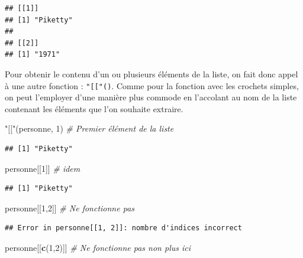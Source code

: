 \documentclass[
  11pt,
]{book}
\newenvironment{Shaded}{\begin{snugshade}}{\end{snugshade}}
\newcommand{\CommentTok}[1]{\textcolor[rgb]{0.56,0.35,0.01}{\textit{#1}}}
\newcommand{\DecValTok}[1]{\textcolor[rgb]{0.00,0.00,0.81}{#1}}
\newcommand{\KeywordTok}[1]{\textcolor[rgb]{0.13,0.29,0.53}{\textbf{#1}}}
\newcommand{\NormalTok}[1]{#1}
\newcommand{\StringTok}[1]{\textcolor[rgb]{0.31,0.60,0.02}{#1}}
\numberwithin{equation}{section}
\numberwithin{countremarque}{section}
\begin{document}
\begin{lstlisting}
## [[1]]
## [1] "Piketty"
## 
## [[2]]
## [1] "1971"
\end{lstlisting}

Pour obtenir le contenu d'un ou plusieurs éléments de la liste, on fait donc appel à une autre fonction : \texttt{"{[}{[}"()}. Comme pour la fonction avec les crochets simples, on peut l'employer d'une manière plus commode en l'accolant au nom de la liste contenant les éléments que l'on souhaite extraire.

\begin{Shaded}
\begin{Highlighting}[]
\StringTok{"[["}\NormalTok{(personne, }\DecValTok{1}\NormalTok{)  }\CommentTok{\# Premier élément de la liste}
\end{Highlighting}
\end{Shaded}

\begin{lstlisting}
## [1] "Piketty"
\end{lstlisting}

\begin{Shaded}
\begin{Highlighting}[]
\NormalTok{personne[[}\DecValTok{1}\NormalTok{]]   }\CommentTok{\# idem}
\end{Highlighting}
\end{Shaded}

\begin{lstlisting}
## [1] "Piketty"
\end{lstlisting}

\begin{Shaded}
\begin{Highlighting}[]
\NormalTok{personne[[}\DecValTok{1}\NormalTok{,}\DecValTok{2}\NormalTok{]] }\CommentTok{\# Ne fonctionne pas}
\end{Highlighting}
\end{Shaded}

\begin{lstlisting}
## Error in personne[[1, 2]]: nombre d'indices incorrect
\end{lstlisting}

\begin{Shaded}
\begin{Highlighting}[]
\NormalTok{personne[[}\KeywordTok{c}\NormalTok{(}\DecValTok{1}\NormalTok{,}\DecValTok{2}\NormalTok{)]]  }\CommentTok{\# Ne fonctionne pas non plus ici}
\end{Highlighting}
\end{Shaded}
\end{document}

